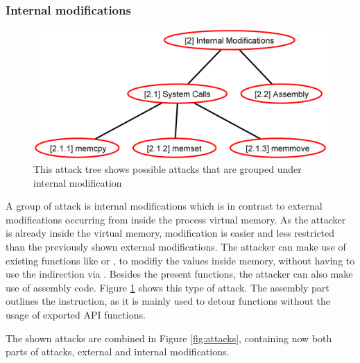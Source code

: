 \subsubsection{Internal modifications}
\label{sec:internal_modifications}
\begin{figure}[h]
\centering
\includegraphics[width=\textwidth, keepaspectratio]{sections/adtrees/InternalModificationsWithoutDefenses.png}
\caption{This attack tree shows possible attacks that are grouped under internal modification}
\label{fig:attacks_internal}
\end{figure}
A group of attack is internal modifications which is in contrast to external modifications occurring from inside the process virtual memory. As the attacker is already inside the virtual memory, modification is easier and less restricted than the previously shown external modifications. The attacker can make use of existing functions like  or , to modifiy the values inside memory, without having to use the indirection via . Besides the present  functions, the attacker can also make use of assembly code. Figure \ref{fig:attacks_internal} shows this type of attack. The assembly part outlines the  instruction, as it is mainly used to detour functions without the usage of exported API functions.

\medskip

The shown attacks are combined in Figure \ref{fig:attacks}, containing now both parts of attacks, external and internal modifications.